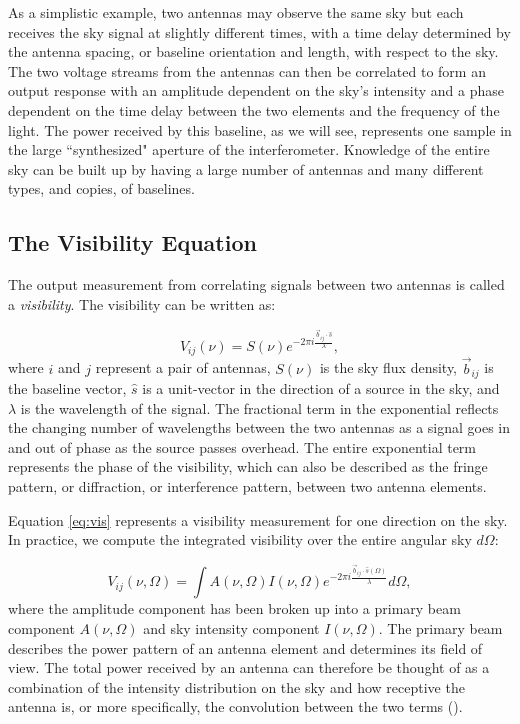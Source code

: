 As a simplistic example, two antennas may observe the same sky but each receives the sky signal at slightly different times, with a time delay determined by the antenna spacing, or baseline orientation and length, with respect to the sky. The two voltage streams from the antennas can then be correlated to form an output response with an amplitude dependent on the sky's intensity and a phase dependent on the time delay between the two elements and the frequency of the light. The power received by this baseline, as we will see, represents one sample in the large ``synthesized" aperture of the interferometer. Knowledge of the entire sky can be built up by having a large number of antennas and many different types, and copies, of baselines.

\subsection{The Visibility Equation}

The output measurement from correlating signals between two antennas is called a \textit{visibility}. The visibility can be written as:

\begin{equation}
\label{eq:vis}
V_{ij}(\nu) = S(\nu) e^{-2\pi i\frac{\vec{b}_{ij}\cdot \hat{s}}{\lambda}},
\end{equation}
where $i$ and $j$ represent a pair of antennas, $S(\nu)$ is the sky flux density, $\vec{b}_{ij}$ is the baseline vector, $\hat{s}$ is a unit-vector in the direction of a source in the sky, and $\lambda$ is the wavelength of the signal. The fractional term in the exponential reflects the changing number of wavelengths between the two antennas as a signal goes in and out of phase as the source passes overhead. The entire exponential term represents the phase of the visibility, which can also be described as the fringe pattern, or diffraction, or interference pattern, between two antenna elements. 

Equation \eqref{eq:vis} represents a visibility measurement for one direction on the sky. In practice, we compute the integrated visibility over the entire angular sky $d\Omega$:

\begin{equation}
V_{ij}(\nu,\Omega) = \int A(\nu,\Omega)I(\nu,\Omega) e^{-2\pi i\frac{\vec{b}_{ij}\cdot \hat{s}(\Omega)}{\lambda}}d\Omega,
\end{equation}
where the amplitude component has been broken up into a primary beam component $A(\nu,\Omega)$ and sky intensity component $I(\nu,\Omega)$. The primary beam describes the power pattern of an antenna element and determines its field of view. The total power received by an antenna can therefore be thought of as a combination of the intensity distribution on the sky and how receptive the antenna is, or more specifically, the convolution between the two terms (\citealt{thompson_et_al2001}).

